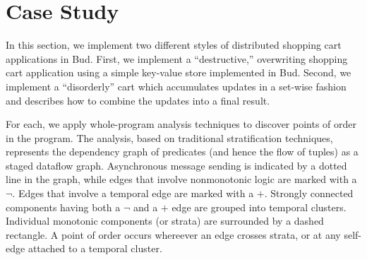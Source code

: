 \section{Case Study}
\label{sec:case}





In this section, we implement two different styles of distributed shopping cart
applications in Bud.  First, we implement a ``destructive,'' overwriting
shopping cart application using a simple key-value store implemented in Bud.
Second, we implement a ``disorderly'' cart which accumulates updates in a 
set-wise fashion and describes how to combine the updates into a final result.

For each, we apply whole-program analysis techniques to discover points of 
order in the program.  The analysis, based on traditional stratification
techniques, represents the dependency graph of predicates (and hence the 
flow of tuples) as a staged dataflow graph.  Asynchronous message sending
is indicated by a dotted line in the graph, while edges that involve 
nonmonotonic logic are marked with a $\lnot$.  Edges that involve a temporal 
edge are marked with a $+$.  Strongly connected components having both a $\lnot$ and a $+$ edge are grouped into temporal clusters.  Individual monotonic components 
(or strata) are surrounded by a dashed rectangle.  A point of order occurs
whereever an edge crosses strata, or at any self-edge attached to a temporal cluster.



